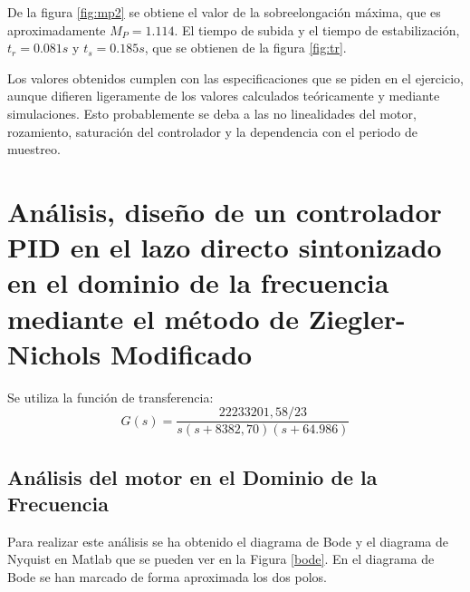 \documentclass[a4paper]{article}
\begin{document}
De la figura \ref{fig:mp2} se obtiene el valor de la sobreelongación máxima, que es aproximadamente $M_P=1.114$. El tiempo de subida y el tiempo de estabilización, $t_r=0.081 s$ y $t_s=0.185 s$, que se obtienen de la figura \ref{fig:tr}.

Los valores obtenidos cumplen con las especificaciones que se piden en el ejercicio, aunque difieren ligeramente de los valores calculados teóricamente y mediante simulaciones. Esto probablemente se deba a las no linealidades del motor, rozamiento, saturación del controlador y la dependencia con el periodo de muestreo.

\section{Análisis, diseño de un controlador PID en el lazo directo sintonizado en el dominio de la frecuencia mediante el método de Ziegler-Nichols Modificado}
Se utiliza la función de transferencia:
\begin{equation}
G(s)=\frac{22233201,58/23}{s(s+8382,70)(s+64.986)}
\end{equation}
\subsection{Análisis del motor en el Dominio de la Frecuencia}
Para realizar este análisis se ha obtenido el diagrama de Bode y el diagrama de Nyquist en Matlab que se pueden ver en la Figura \ref{bode}. En el diagrama de Bode se han marcado de forma aproximada los dos polos.
\end{document}

